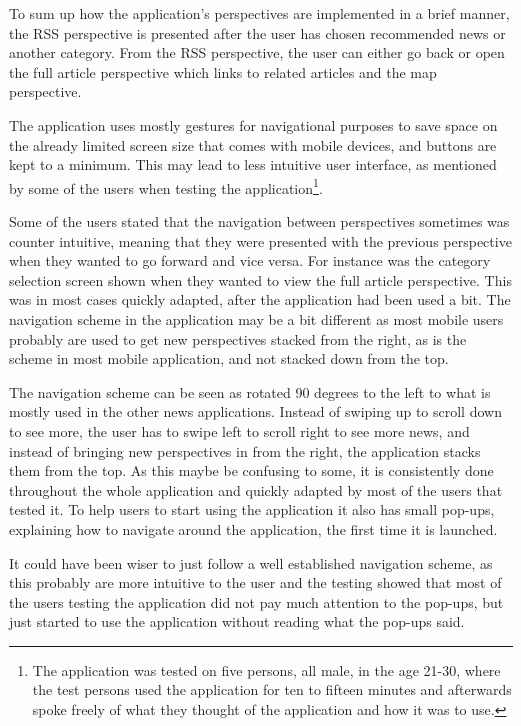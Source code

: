 To sum up how the application's perspectives are implemented in a brief manner, the RSS perspective is presented after the user has chosen recommended news or another category. From the RSS perspective, the user can either go back or open the full article perspective which links to related articles and the map perspective.

The application uses mostly gestures for navigational purposes to save space on the already limited screen size that comes with mobile devices, and buttons are kept to a minimum. This may lead to less intuitive user interface, as mentioned by some of the users when testing the application\footnote{The application was tested on five persons, all male, in the age 21-30, where the test persons used the application for ten to fifteen minutes and afterwards spoke freely of what they thought of the application and how it was to use.}. 

Some of the users stated that the navigation between perspectives sometimes was counter intuitive, meaning that they were presented with the previous perspective when they wanted to go forward and vice versa. For instance was the category selection screen shown when they wanted to view the full article perspective. This was in most cases quickly adapted, after the application had been used a bit. The navigation scheme in the application may be a bit different as most mobile users probably are used to get new perspectives stacked from the right, as is the scheme in most mobile application, and not stacked down from the top. 

The navigation scheme can be seen as rotated 90 degrees to the left to what is mostly used in the other news applications. Instead of swiping up to scroll down to see more, the user has to swipe left to scroll right to see more news, and instead of bringing new perspectives in from the right, the application stacks them from the top. As this maybe be confusing to some, it is consistently done throughout the whole application and quickly adapted by most of the users that tested it. To help users to start using the application it also has small pop-ups, explaining how to navigate around the application, the first time it is launched.

It could have been wiser to just follow a well established navigation scheme, as this probably are more intuitive to the user and the testing showed that most of the users testing the application did not pay much attention to the pop-ups, but just started to use the application without reading what the pop-ups said.

